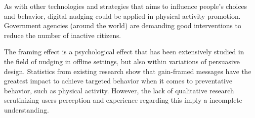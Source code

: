 As with other technologies and strategies that aims to influence people's choices and behavior, digital nudging could be applied in physical activity promotion. Government agencies (around the world) are demanding good interventions to reduce the number of inactive citizens.

The framing effect is a psychological effect that has been extensively studied in the field of nudging in offline settings, but also within variations of persuasive design. Statistics from existing research show that gain-framed messages have the greatest impact to achieve targeted behavior when it comes to preventative behavior, such as physical activity. However, the lack of qualitative research scrutinizing users perception and experience regarding this imply a incomplete understanding. 
